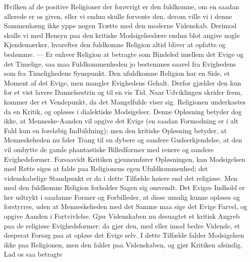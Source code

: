 \documentclass[12pt,a4paper]{book}
\begin{document}
Hvilken af de positive Religioner der forøvrigt er den fuldkomne, om en saadan
allerede er os given, eller vi endnu skulle forvente den, derom ville vi i denne
Sammenhæng ikke yppe nogen Trætte med den moderne Videnskab. Derimod skulle vi
med Hensyn paa den kritiske Modsigelseslære endnu blot angive nogle
Kjendemærker, hvorefter den fuldkomne Religion altid bliver at opfatte og
bedømme. --- Er enhver Religion at betragte som Bindeled imellem det Evige og det
Timelige, saa maa Fuldkommenheden jo bestemmes saavel fra Evighedens som fra
Timelighedens Synspunkt. Den ufuldkomne Religion har en Side, et Moment af det
Evige, men mangler Evighedens Gehalt. Derfor gjælder den kun for et vist lavere
Dannelsestrin og til en vis Tid. Naar Udviklingen skrider frem, kommer der et
Vendepunkt, da det Mangelfulde viser sig. Religionen underkastes da en Kritik, og
opløses i dialektiske Modsigelser. Denne Opløsning betyder dog ikke, at
Menneske-Aanden vil opgive det Evige (en saadan Formodning er i alt Fald kun en
foreløbig Indbildning); men den kritiske Opløsning betyder, at Menneskeheden nu
føler Trang til en dybere og sandere Gudserkjendelse, at den vil ombytte de gamle
phantastiske Billedformer med renere og sandere Evighedsformer. Forsaavidt
Kritiken gjennemfører Opløsningen, kan Modsigelsen med Rette siges at falde paa
Religionens egen Ufuldkommenhed; det videnskabelige Standpunkt er da i dette
Tilfælde høiere end det religiøse. Men med den fuldkomne Religion forholder Sagen
sig omvendt. Det Eviges Indhold er her udtrykt i saadanne Former og Forbilleder,
at disse umulig kunne opløses og forstyrres, uden at Menneskeheden med det Samme
maa sige det Evige Farvel, og opgive Aanden i Fortvivlelse. Gjør Videnskaben nu
desuagtet et kritisk Angreb paa de religiøse Evighedsformer: da gjør den, med
eller imod bedre Vidende, et desperat Forsøg paa at
opløse det Evige selv. I dette Tilfælde falder Modsigelsen ikke paa Religionen, men
den falder paa Videnskaben, og gjør Kritiken afsindig. Lad os saa betragte
\end{document}
